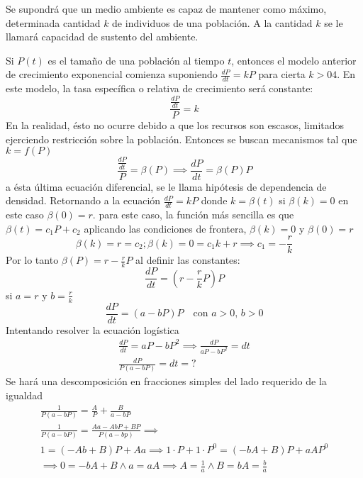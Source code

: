 Se supondrá que un medio ambiente es capaz de mantener como máximo, determinada cantidad $k$ de individuos de una población. A la cantidad $k$ se le llamará capacidad de sustento del ambiente.

Si $P(t)$ es el tamaño de una población al tiempo $t$, entonces el modelo anterior de crecimiento exponencial comienza suponiendo $\frac{dP}{dt}=kP$ para cierta $k>04$. En este modelo, la tasa específica o relativa de crecimiento será constante:
\begin{equation*}
    \frac{\frac{dP}{dt}}{P} = k
\end{equation*}
En la realidad, ésto no ocurre debido a que los recursos son escasos, limitados ejerciendo restricción sobre la población. Entonces se buscan mecanismos tal que $k=f(P)$
\begin{equation}
    \frac{\frac{dP}{dt}}{P} = \beta(P)\implies \frac{dP}{dt} = \beta(P)P
\end{equation}
a ésta última ecuación diferencial, se le llama hipótesis de dependencia de densidad. Retornando a la ecuación $\frac{dP}{dt}=kP$ donde $k=\beta(t)$ si $\beta(k)=0$ en este caso $\beta(0)=r$. para este caso, la función más sencilla es que $\beta(t)=c_1P+c_2$ aplicando las condiciones de frontera, $\beta(k)=0$ y $\beta(0)=r$
\begin{equation*}
    \beta(k) = r= c_2;\beta(k) = 0 = c_1k+ r\implies c_1 = - \frac{r}{k}
\end{equation*}
Por lo tanto $\beta(P)=r-\frac{r}{k}P$ al definir las constantes:
\begin{equation*}
    \frac{dP}{dt} = \left( r-\frac{r}{k}P \right)P
\end{equation*}
si $a=r$ y $b=\frac{r}{k}$
\begin{equation*}
    \frac{dP}{dt} = \left( a-bP \right)P\quad \text{con } a>0,\, b>0
\end{equation*}
Intentando resolver la ecuación logística
\begin{align*}
    \frac{dP}{dt} = aP - bP^2\implies \frac{dP}{aP - bP^2} = dt\\
    \frac{dP}{P\left( a - bP \right)} = dt = ?
\end{align*}
Se hará una descomposición en fracciones simples del lado requerido de la igualdad
\begin{align*}
    \frac{1}{P\left( a - bP \right)} = \frac{A}{P} + \frac{B}{a - bP}\\
    \frac{1}{P(a - bP)} = \frac{Aa - AbP + BP}{P(a - bp)}\implies\\
    1 = \left( - Ab + B \right)P + Aa\implies 1\cdot P + 1\cdot P^0 =( - bA + B)P + aAP^0\\
\implies 0 =- bA + B\land a = aA\implies A = \frac{1}{a}\land B = bA = \frac{b}{a}
\end{align*}

